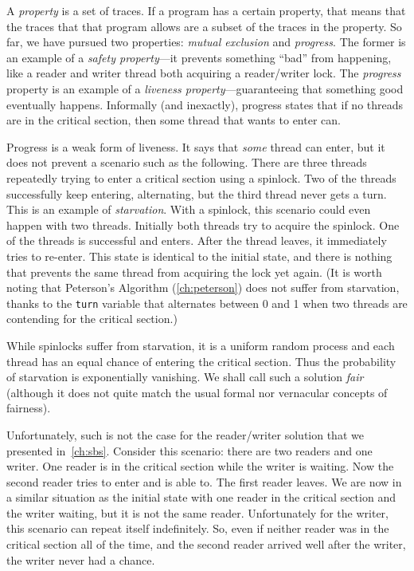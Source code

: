 \documentclass{report}
\begin{document}
%

A \emph{property}
%
is a set of traces.
If a program has a certain property, that means that the traces that that
program allows are a subset of the traces in the property.
So far, we have pursued two properties: \emph{mutual exclusion}
and \emph{progress}.  The former is an example of a
\emph{safety property}---it prevents something ``bad'' from
happening, like a reader and writer thread both acquiring a
reader/writer lock.
The \emph{progress} property is an example
of a \emph{liveness property}---guaranteeing that something good
eventually happens.
Informally (and inexactly), progress states that if no threads
are in the critical section, then some thread that wants to enter
can.

Progress is a weak form of liveness.  It says that \emph{some}
thread can enter, but it does not prevent a scenario such as
the following.  There are three threads repeatedly trying to
enter a critical section using a spinlock.  Two of
the threads successfully keep entering, alternating, but the third
thread never gets a turn.  This is an example of
\emph{starvation}.  With a spinlock, this scenario could
even happen with two threads.  Initially both threads
try to acquire the spinlock.  One of the threads is
successful and enters.  After the thread leaves, it immediately
tries to re-enter.  This state is identical to the initial
state, and there is nothing that prevents the same thread
from acquiring the lock yet again.
%
(It is worth noting that Peterson's Algorithm (\autoref{ch:peterson})
does not suffer from starvation, thanks to the \texttt{turn} variable
that alternates between 0 and 1 when two threads are contending for
the critical section.)

While spinlocks suffer from starvation, it is a uniform random
process and each thread has an equal chance of entering the critical
section.  Thus the probability of starvation is exponentially vanishing.
We shall call such a solution \emph{fair}
%
(although it does not quite
match the usual formal nor vernacular concepts of fairness).

%

Unfortunately, such is not the case for the
reader/writer solution that we presented in~\autoref{ch:sbs}.
Consider this scenario: there are two readers and one writer.  One reader
is in the critical section while the writer is waiting.  Now the
second reader tries to enter and is able to.  The first reader leaves.
We are now in a similar situation as the initial state with one reader
in the critical section and the writer waiting, but it is not the same
reader.  Unfortunately for the writer, this scenario can repeat itself
indefinitely.  So, even if neither reader was in the critical section
all of the time, and the second reader arrived well after the writer,
the writer never had a chance.
\end{document}
